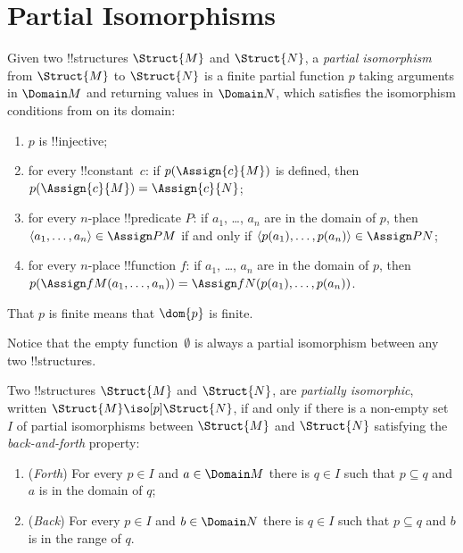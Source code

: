 \documentclass[../../../include/open-logic-section]{subfiles}
\begin{document}
\section{Partial Isomorphisms}

\begin{defn}
  Given two !!{structure}s $\Struct{M}$ and $\Struct{N}$, a
  \emph{partial isomorphism} from $\Struct{M}$ to $\Struct{N}$ is a
  finite partial function $p$ taking arguments in $\Domain M$ and returning
  values in $\Domain N$, which satisfies the isomorphism conditions from
   on its domain:
  \begin{enumerate}
  \item $p$ is !!{injective};
  \item for every !!{constant}~$c$: if $p(\Assign{c}{M})$ is defined,
    then $p(\Assign{c}{M}) = \Assign{c}{N}$;
  \item for every $n$-place !!{predicate} $P$: if $a_1$, \dots, $a_n$
    are in the domain of $p$, then $\langle a_1, \dots, a_n\rangle \in
    \Assign P M$ if and only if $\langle p(a_1), \dots, p(a_n) \rangle
    \in \Assign P N$;
  \item for every $n$-place !!{function} $f$: if $a_1$, \dots, $a_n$
    are in the domain of $p$, then $p(\Assign f M (a_1, \dots,a_n))
    = \Assign f N (p(a_1), \dots, p(a_n))$.
  \end{enumerate}
  That $p$ is finite means that $\dom{p}$ is finite.
\end{defn}

Notice that the empty function~$\emptyset$ is always a partial
isomorphism between any two !!{structure}s.

\begin{defn}
  Two !!{structure}s $\Struct{M}$ and $\Struct{N}$, are
  \emph{partially isomorphic}, written $\Struct{M} \iso[p]
  \Struct{N}$, if and only if there is a non-empty set $I$
  of partial isomorphisms between $\Struct{M}$ and $\Struct{N}$
  satisfying the \emph{back-and-forth} property:
  \begin{enumerate}
  \item (\emph{Forth}) For every $p \in I$ and $a \in \Domain M$
    there is $q \in I$ such that $p \subseteq q$ and $a$ is
    in the domain of $q$;
  \item (\emph{Back}) For every $p \in I$ and $b \in \Domain N$
    there is $q \in I$ such that $p \subseteq q$ and $b$ is
    in the range of $q$.
  \end{enumerate}
\end{defn}
\end{document}
